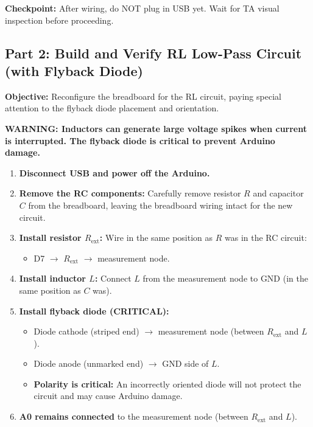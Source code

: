 \documentclass[11pt,letterpaper]{article}
\providecommand{\cpECE}[1]{\textcolor{OliveGreen}{\textbf{Checkpoint:} #1}}
\begin{document}
\cpECE{After wiring, do NOT plug in USB yet. Wait for TA visual inspection before proceeding.}

\subsection{Part 2: Build and Verify RL Low-Pass Circuit (with Flyback Diode)}

\textbf{Objective:} Reconfigure the breadboard for the RL circuit, paying special attention to the flyback diode placement and orientation.

\textbf{WARNING: Inductors can generate large voltage spikes when current is interrupted. The flyback diode is critical to prevent Arduino damage.}

\begin{enumerate}
    \item \textbf{Disconnect USB and power off the Arduino.}

    \item \textbf{Remove the RC components:} Carefully remove resistor $R$ and capacitor $C$ from the breadboard, leaving the breadboard wiring intact for the new circuit.

    \item \textbf{Install resistor $R_{\text{ext}}$:} Wire in the same position as $R$ was in the RC circuit:
    \begin{itemize}
        \item D7 $\rightarrow$ $R_{\text{ext}}$ $\rightarrow$ measurement node.
    \end{itemize}

    \item \textbf{Install inductor $L$:} Connect $L$ from the measurement node to GND (in the same position as $C$ was).

    \item \textbf{Install flyback diode (CRITICAL):}
    \begin{itemize}
        \item Diode cathode (striped end) $\rightarrow$ measurement node (between $R_{\text{ext}}$ and $L$).
        \item Diode anode (unmarked end) $\rightarrow$ GND side of $L$.
        \item \textbf{Polarity is critical:} An incorrectly oriented diode will not protect the circuit and may cause Arduino damage.
    \end{itemize}

    \item \textbf{A0 remains connected} to the measurement node (between $R_{\text{ext}}$ and $L$).


\end{enumerate}
\end{document}
